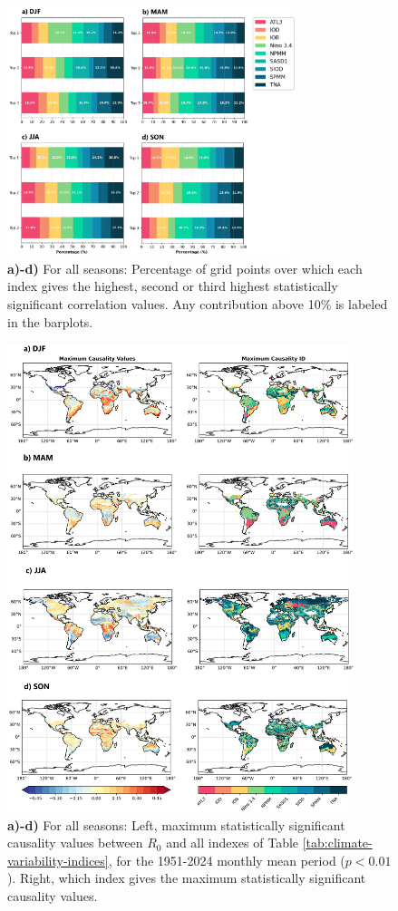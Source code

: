 \documentclass[10pt,twocolumn]{wlscirep}
\begin{document}
\begin{figure}[!ht]
  \centering
  \includegraphics[width=0.75\textwidth]{correlation_barplots.png}
  \caption{\textbf{a)-d)} For all seasons: Percentage of grid points over which each index gives the highest, second or third highest statistically significant correlation values. Any contribution above 10\% is labeled in the barplots.}
  \label{fig:barplots-correlation}
\end{figure}

\begin{figure}[!ht]
  \centering
  \includegraphics[width=0.9\textwidth]{causality_final_global_ps.png}
  \caption{\textbf{a)-d)} For all seasons: Left, maximum statistically significant causality values between $R_0$ and all indexes of Table \ref{tab:climate-variability-indices}, for the 1951-2024 monthly mean period ($p < 0.01$). Right, which index gives the maximum statistically significant causality values. }
  \label{fig:global-causality-final}
\end{figure}
\end{document}

